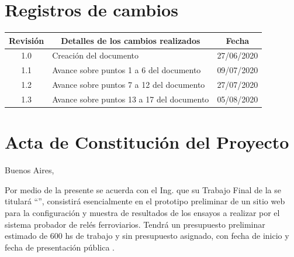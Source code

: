 \documentclass[11pt]{charter}
\begin{document}
\maketitle
\thispagestyle{empty}
\pagebreak


\thispagestyle{empty}
{\setlength{\parskip}{0pt}
\tableofcontents{}
}
\pagebreak


\section{Registros de cambios}
\label{sec:registro}


\begin{table}[ht]
\label{tab:registro}
\centering
\begin{tabularx}{\linewidth}{@{}|c|X|c|@{}}
\hline
\rowcolor[HTML]{C0C0C0} 
Revisión & \multicolumn{1}{c|}{\cellcolor[HTML]{C0C0C0}Detalles de los cambios realizados} & Fecha      \\ \hline
1.0      & Creación del documento                                          & 27/06/2020 \\ \hline
1.1      & Avance sobre puntos 1 a 6 del documento                                                               & 09/07/2020 \\ \hline
1.2      & Avance sobre puntos 7 a 12 del documento                                                               & 27/07/2020 \\ \hline
1.3      & Avance sobre puntos 13 a 17 del documento                                                               & 05/08/2020 \\ \hline
\end{tabularx}
\end{table}

\pagebreak



\section{Acta de Constitución del Proyecto}
\label{sec:acta}

\begin{flushright}
Buenos Aires, \fechaInicioName
\end{flushright}

\vspace{2cm}

Por medio de la presente se acuerda con el Ing. \authorname\hspace{1px} que su Trabajo Final de la \degreename\hspace{1px} se titulará ``\ttitle'', consistirá esencialmente en el prototipo preliminar de un sitio web para la configuración y muestra de resultados de los ensayos a realizar por el sistema probador de relés ferroviarios.
Tendrá un presupuesto preliminar estimado de 600 hs de trabajo y sin presupuesto asignado, con fecha de inicio \fechaInicioName\hspace{1px} y fecha de presentación pública \fechaFinalName.
\end{document}
